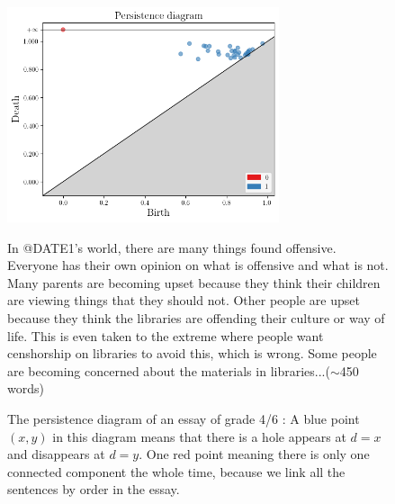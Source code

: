 \begin{figure}[H]
\begin{minipage}{0.49\linewidth}
\includegraphics[width=8cm]{pdessay.png}
\end{minipage}
\begin{minipage}{0.49\linewidth}
\begin{mdframed}
In @DATE1's world, there are many things found offensive.  Everyone has their own opinion on what is offensive and what is not. Many parents are becoming upset because they think their children are viewing things that they should not.  Other people are upset because they think the libraries are offending their culture or way of life.  This is even taken to the extreme where people want censhorship on libraries to avoid this, which is wrong.     Some people are becoming concerned about the materials in libraries...($\sim$450 words)
\end{mdframed}
\end{minipage}
\caption{The persistence diagram of an essay of grade 4/6 : A blue point $(x, y)$ in this diagram means
that there is a hole appears at $d=x$ and disappears at $d=y$.
One red point meaning there is only one connected component the whole time,
because we link all the sentences by order in the essay.
}
\label{fig:pd}
\end{figure}


